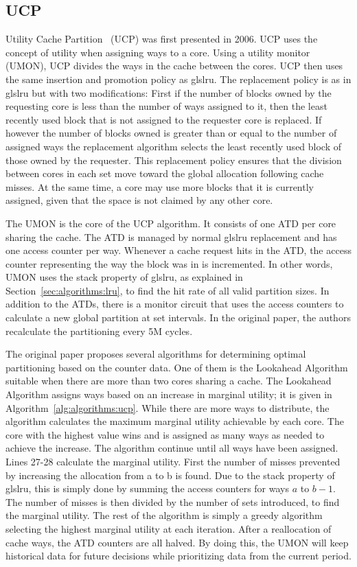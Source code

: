 \subsection{UCP}
\label{sec:algorithms:ucp}

Utility Cache Partition~\cite{Qureshi2006} (UCP) was first presented in 2006. 
UCP uses the concept of utility when assigning ways to a core.
Using a utility monitor (UMON), UCP divides the ways in the cache between the cores.
UCP then uses the same insertion and promotion policy as gls{lru}.
The replacement policy is as in gls{lru} but with two modifications:
First if the number of blocks owned by the requesting core is less than the number of ways assigned to it, then the least recently used block that is not assigned to the requester core is replaced.
If however the number of blocks owned is greater than or equal to the number of assigned ways the replacement algorithm selects the least recently used block of those owned by the requester.
This replacement policy ensures that the division between cores in each set move toward the global allocation following cache misses.
At the same time, a core may use more blocks that it is currently assigned, given that the space is not claimed by any other core.

The UMON is the core of the UCP algorithm.
It consists of one ATD per core sharing the cache. 
The ATD is managed by normal gls{lru} replacement and has one access counter per way.
Whenever a cache request hits in the ATD, the access counter representing the way the block was in is incremented.
In other words, UMON uses the stack property of gls{lru}, as explained in Section~\ref{sec:algorithms:lru}, to find the hit rate of all valid partition sizes.
In addition to the ATDs, there is a monitor circuit that uses the access counters to calculate a new global partition at set intervals.
In the original paper, the authors recalculate the partitioning every 5M cycles.

The original paper proposes several algorithms for determining optimal partitioning based on the counter data. 
One of them is the Lookahead Algorithm suitable when there are more than two cores sharing a cache.
The Lookahead Algorithm assigns ways based on an increase in marginal utility; it is given in Algorithm~\ref{alg:algorithms:ucp}.
While there are more ways to distribute, the algorithm calculates the maximum marginal utility achievable by each core. 
The core with the highest value wins and is assigned as many ways as needed to achieve the increase.
The algorithm continue until all ways have been assigned.
Lines 27-28 calculate the marginal utility. 
First the number of misses prevented by increasing the allocation from a to b is found.
Due to the stack property of gls{lru}, this is simply done by summing the access counters for ways $a$ to $b-1$.
The number of misses is then divided by the number of sets introduced, to find the marginal utility.
The rest of the algorithm is simply a greedy algorithm selecting the highest marginal utility at each iteration.
After a reallocation of cache ways, the ATD counters are all halved.
By doing this, the UMON will keep historical data for future decisions while prioritizing data from the current period.

